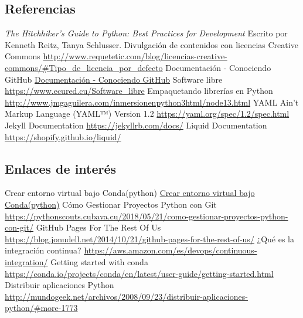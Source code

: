  
\begin{thebibliography}{99}

\subsection*{Referencias}
 \textit{The Hitchhiker's Guide to Python: Best Practices for Development} Escrito por Kenneth Reitz, Tanya Schlusser.
\bibitem{} Divulgación de contenidos con licencias Creative Commons \url{http://www.requetetic.com/blog/licencias-creative-commons/#Tipo_de_licencia_por_defecto}
\bibitem{} Documentación - Conociendo GitHub \url{Documentación - Conociendo GitHub}
\bibitem{} Software libre \url{https://www.ecured.cu/Software_libre}
\bibitem{} Empaquetando librerías en Python \url{http://www.jmgaguilera.com/inmersionenpython3html/node13.html}
\bibitem{} YAML Ain’t Markup Language (YAML™) Version 1.2 \url{https://yaml.org/spec/1.2/spec.html}
\bibitem{} Jekyll Documentation \url{https://jekyllrb.com/docs/}
\bibitem{} Liquid Documentation \url{https://shopify.github.io/liquid/}

\subsection*{Enlaces de interés}
\bibitem{} Crear entorno virtual bajo Conda(python) \url{Crear entorno virtual bajo Conda(python)}
\bibitem{} Cómo Gestionar Proyectos Python con Git \url{https://pythonscouts.cubava.cu/2018/05/21/como-gestionar-proyectos-python-con-git/}
\bibitem{} GitHub Pages For The Rest Of Us \url{https://blog.jonudell.net/2014/10/21/github-pages-for-the-rest-of-us/}
\bibitem{} ¿Qué es la integración continua? \url{https://aws.amazon.com/es/devops/continuous-integration/}
\bibitem{} Getting started with conda \url{https://conda.io/projects/conda/en/latest/user-guide/getting-started.html}
\bibitem{} Distribuir aplicaciones Python \url{http://mundogeek.net/archivos/2008/09/23/distribuir-aplicaciones-python/#more-1773}

\end{thebibliography}